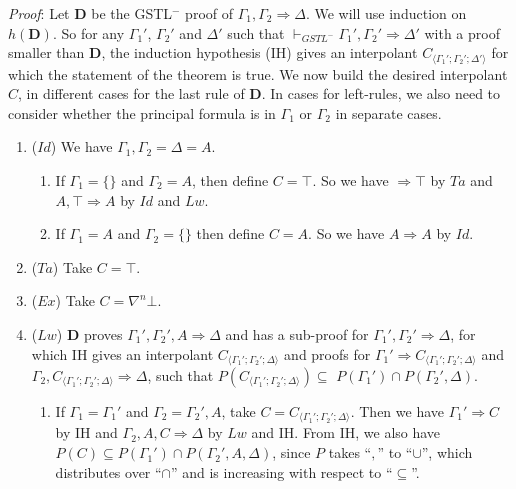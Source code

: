 \textit{Proof}: Let $\mathbf{D}$ be the GSTL$^-$ proof of $\Gamma_1 , \Gamma_2 \Rightarrow \Delta$. We will use induction on $h(\mathbf{D})$. So for any $\Gamma_1'$, $\Gamma_2'$ and $\Delta'$ such that $\vdash_{GSTL^-} \Gamma_1' , \Gamma_2' \Rightarrow \Delta'$ with a proof smaller than $\mathbf{D}$, the induction hypothesis (IH) gives an interpolant $C_{\langle\Gamma_1'; \Gamma_2'; \Delta'\rangle}$ for which the statement of the theorem is true. We now build the desired interpolant $C$, in different cases for the last rule of $\mathbf{D}$. In cases for left-rules, we also need to consider whether the principal formula is in $\Gamma_1$ or $\Gamma_2$ in separate cases.
\begin{enumerate}
	\item ($Id$) We have $\Gamma_1,\Gamma_2 = \Delta = A$.
	\begin{enumerate}
		\item If $\Gamma_1 = \{\}$ and $\Gamma_2 = A$, then define $C = \top$. So we have $\Rightarrow \top$ by $Ta$ and $A , \top \Rightarrow A$ by $Id$ and $Lw$.
		
		\item If $\Gamma_1 = A$ and $\Gamma_2 = \{\}$ then define $C = A$. So we have $A \Rightarrow A$ by $Id$.
	\end{enumerate}
	\item ($Ta$) Take $C = \top$.
	
	\item ($Ex$) Take $C = \nabla^n \bot$.
	
	\item ($Lw$) $\mathbf{D}$ proves $\Gamma_1' , \Gamma_2' , A \Rightarrow \Delta$ and has a sub-proof for $\Gamma_1' , \Gamma_2' \Rightarrow \Delta$, for which IH gives an interpolant $C_{\langle\Gamma_1';\Gamma_2';\Delta\rangle}$ and proofs for $\Gamma_1' \Rightarrow C_{\langle\Gamma_1';\Gamma_2';\Delta\rangle}$ and $\Gamma_2 , C_{\langle\Gamma_1';\Gamma_2';\Delta\rangle} \Rightarrow \Delta$, such that $P(C_{\langle\Gamma_1';\Gamma_2';\Delta\rangle}) \subseteq$ $ P(\Gamma_1') \cap P(\Gamma_2' , \Delta)$.
	\begin{enumerate}
		\item If $\Gamma_1 = \Gamma_1'$ and $\Gamma_2 = \Gamma_2' , A$, take $C = C_{\langle\Gamma_1';\Gamma_2';\Delta\rangle}$. Then we have  $\Gamma_1' \Rightarrow C$ by IH and $\Gamma_2 , A , C \Rightarrow \Delta$ by $Lw$ and IH. From IH, we also have $P(C) \subseteq P(\Gamma_1') \cap P(\Gamma_2' , A , \Delta)$, since $P$ takes ``$,$'' to ``$\cup$'', which distributes over ``$\cap$'' and is increasing with respect to ``$\subseteq$''.
		

\end{enumerate}
\end{enumerate}
